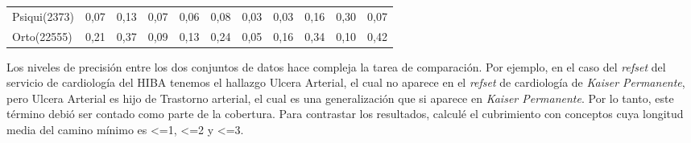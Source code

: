 \begin{table}[htb]
{\begin{tabular}{@{}lllllllllll@{}}
Psiqui(2373)                                         & 0,07                  & 0,13                 & 0,07                  & 0,06               & 0,08                 & 0,03                   & 0,03                & 0,16                 & 0,30                   & 0,07                \\
Orto(22555)                                          & 0,21                  & 0,37                 & 0,09                  & 0,13               & 0,24                 & 0,05                   & 0,16                & 0,34                 & 0,10                   & 0,42                \\ \bottomrule
\end{tabular}%
}
\end{table}

Los niveles de precisión entre los dos conjuntos de datos hace compleja la tarea de comparación. Por ejemplo, en el caso del \textit{\acrshort{refset}} del servicio de cardiología del \acrshort{HIBA} tenemos el hallazgo Ulcera Arterial, el cual no aparece en el \textit{\acrshort{refset}}  de cardiología de \textit{Kaiser Permanente}, pero Ulcera Arterial es hijo de Trastorno arterial, el cual es una generalización que si aparece en \textit{Kaiser Permanente}. Por lo tanto, este término debió ser contado como parte de la cobertura. Para contrastar los resultados, calculé el cubrimiento con conceptos cuya longitud media del camino mínimo es \textless=1, \textless=2 y \textless=3. 

